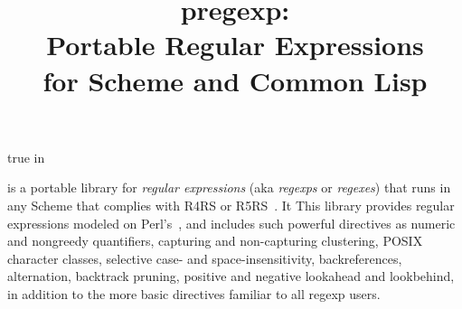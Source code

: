 \ifx\MzLibManual\Undefined



 true in

\ifx\shipout\UNDEFINED

\let\PRIMsection\section
\def\section{\htmlpagebreak\PRIMsection}
\fi

\let\CITE\cite
\let\SECTION\section

\def\Index#1{}

\def\meta[#1]{{\em #1}}

\let\rawscm\scm

\title{pregexp: \\
Portable Regular Expressions \\
for Scheme and Common Lisp}

\centerline{}

\bigskip
\else



\newcommand{\CITE}[2][]{}
\let\Index\index
\let\f\footnote


\fi

\ifx\MzLibManual\Undefined
\n {} is a portable library for {\em
regular expressions} (aka {\em regexps} or {\em
regexes}) that runs in any Scheme
that complies with R4RS or R5RS~\cite{r5rs}.  It
\else
This library
\fi
provides regular expressions
modeled on
Perl's~\CITE{friedl:regex,pperl}, and includes such
powerful directives as numeric and nongreedy
quantifiers, capturing and non-capturing clustering,
POSIX character classes, selective case- and
space-insensitivity, backreferences, alternation,
backtrack pruning,
positive and negative lookahead and lookbehind, in
addition to the more basic directives familiar to all
regexp users.

